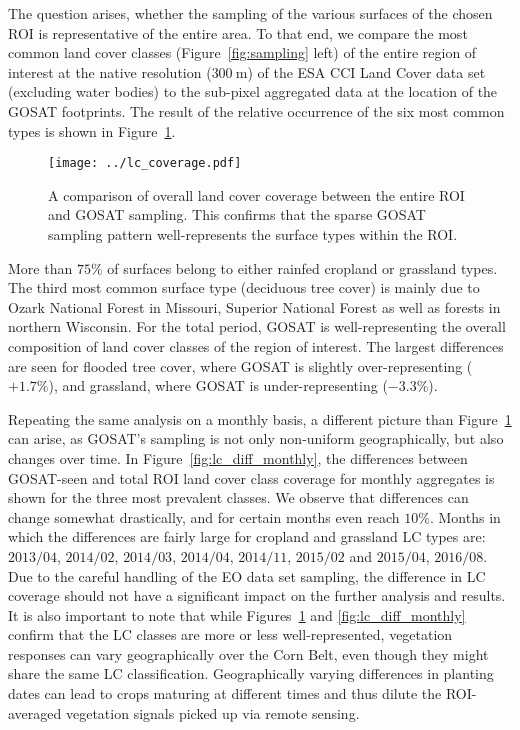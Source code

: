 \documentclass[preprint, a4paper, 10pt, times, 5p]{elsarticle}
\begin{document}
The question arises, whether the sampling of the various surfaces of the chosen ROI is representative of the entire area. To that end, we compare the most common land cover classes (Figure~\ref{fig:sampling} left) of the entire region of interest at the native resolution ($300\:\mathrm{m}$) of the ESA CCI Land Cover data set (excluding water bodies) to the sub-pixel aggregated data at the location of the GOSAT footprints. The result of the relative occurrence of the six most common types is shown in Figure~\ref{fig:lc_coverage}. 

\begin{figure}[htbp]
\centering
\texttt{[image: ../lc\_coverage.pdf]}
\caption{A comparison of overall land cover coverage between the entire ROI and GOSAT sampling. This confirms that the sparse GOSAT sampling pattern well-represents the surface types within the ROI.}
\label{fig:lc_coverage}
\end{figure}

More than $75\%$ of surfaces belong to either rainfed cropland or grassland types. The third most common surface type (deciduous tree cover) is mainly due to Ozark National Forest in Missouri, Superior National Forest as well as forests in northern Wisconsin. For the total period, GOSAT is well-representing the overall composition of land cover classes of the region of interest. The largest differences are seen for flooded tree cover, where GOSAT is slightly over-representing ($+1.7\%$), and grassland, where GOSAT is under-representing ($-3.3\%$).

Repeating the same analysis on a monthly basis, a different picture than Figure~\ref{fig:lc_coverage} can arise, as GOSAT's sampling is not only non-uniform geographically, but also changes over time. In Figure~\ref{fig:lc_diff_monthly}, the differences between GOSAT-seen and total ROI land cover class coverage for monthly aggregates is shown for the three most prevalent classes. We observe that differences can change somewhat drastically, and for certain months even reach $10\%$. Months in which the differences are fairly large for cropland and grassland LC types are: $2013/04$, $2014/02$, $2014/03$, $2014/04$, $2014/11$, $2015/02$ and $2015/04$, $2016/08$. Due to the careful handling of the EO data set sampling, the difference in LC coverage should not have a significant impact on the further analysis and results. It is also important to note that while Figures~\ref{fig:lc_coverage} and \ref{fig:lc_diff_monthly} confirm that the LC classes are more or less well-represented, vegetation responses can vary geographically over the Corn Belt, even though they might share the same LC classification. Geographically varying differences in planting dates can lead to crops maturing at different times and thus dilute the ROI-averaged vegetation signals picked up via remote sensing.
\end{document}
